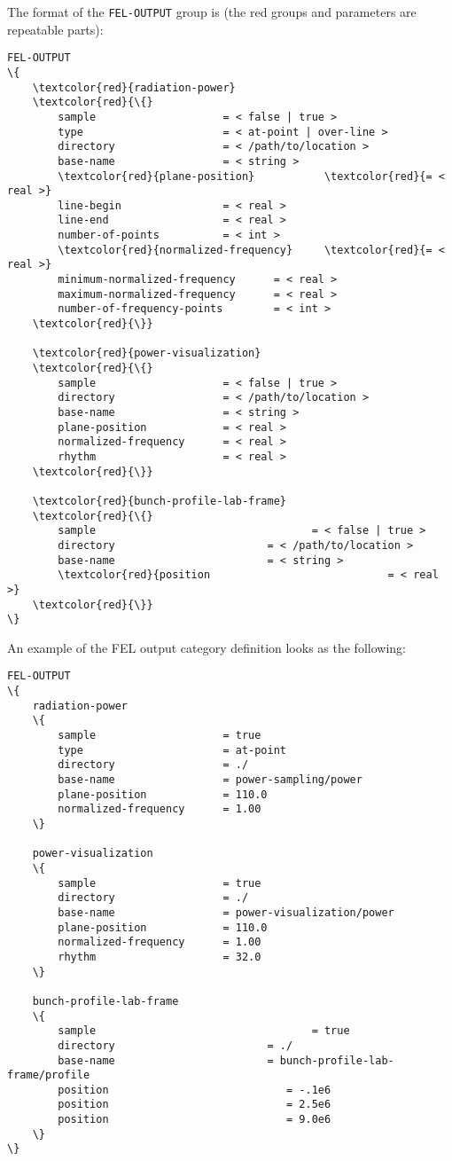 The format of the \texttt{FEL-OUTPUT} group is (the red groups and parameters are repeatable parts):
\begin{Verbatim}[frame=single, fontsize=\small, tabsize=4, fontfamily=courier, fontseries=b, commandchars=\\\{\}, obeytabs]
FEL-OUTPUT
\{
	\textcolor{red}{radiation-power}
	\textcolor{red}{\{}
		sample					  = < false | true >
		type					  = < at-point | over-line >
		directory				  = < /path/to/location >
		base-name				  = < string >
		\textcolor{red}{plane-position}  		  \textcolor{red}{= < real >}
		line-begin				  = < real >
		line-end				  = < real >
		number-of-points		  = < int >
		\textcolor{red}{normalized-frequency}	  \textcolor{red}{= < real >}
		minimum-normalized-frequency	  = < real >
		maximum-normalized-frequency	  = < real >
		number-of-frequency-points		  = < int >
	\textcolor{red}{\}}

	\textcolor{red}{power-visualization}
	\textcolor{red}{\{}
		sample					  = < false | true >
		directory				  = < /path/to/location >
		base-name				  = < string >
		plane-position			  = < real >
		normalized-frequency	  = < real >
		rhythm					  = < real >
	\textcolor{red}{\}}

	\textcolor{red}{bunch-profile-lab-frame}
	\textcolor{red}{\{}
		sample  								= < false | true >
		directory  						 = < /path/to/location >
		base-name  						 = < string >
        \textcolor{red}{position                            = < real >}
	\textcolor{red}{\}}
\}
\end{Verbatim}
An example of the FEL output category definition looks as the following:
\begin{snugshade}
\begin{Verbatim}[fontsize=\small, tabsize=4, fontfamily=courier, fontseries=b, commandchars=\\\{\}, obeytabs]
FEL-OUTPUT
\{
	radiation-power
	\{
		sample					  = true
		type					  = at-point
		directory				  = ./
		base-name				  = power-sampling/power
		plane-position			  = 110.0
		normalized-frequency	  = 1.00
	\}
	
	power-visualization
	\{
		sample					  = true
		directory				  = ./
		base-name				  = power-visualization/power
		plane-position			  = 110.0
		normalized-frequency	  = 1.00
		rhythm					  = 32.0
	\}

	bunch-profile-lab-frame
	\{
		sample  								= true
		directory  						 = ./
		base-name  						 = bunch-profile-lab-frame/profile
		position		  					= -.1e6
        position		  					= 2.5e6
        position		  					= 9.0e6
	\}
\}
\end{Verbatim}
\end{snugshade} 